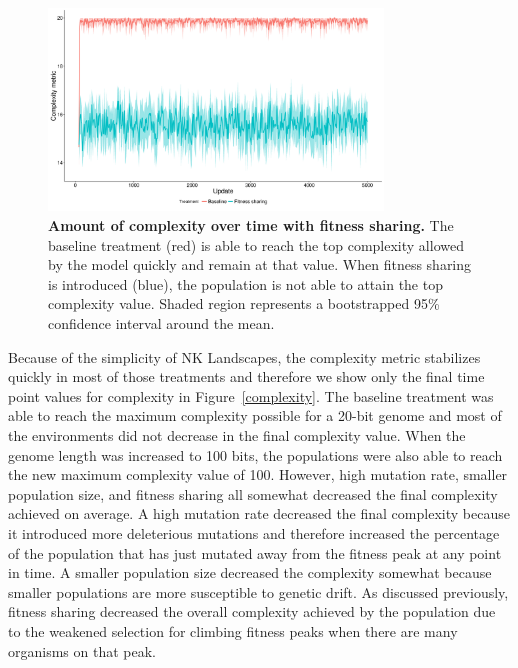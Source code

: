 \documentclass[letterpaper]{article}
\begin{document}
\begin{figure}
\includegraphics[width=3.5in]{figs/complexity_fitness_sharing.png}
\caption{\textbf{Amount of complexity over time with fitness sharing.} The baseline treatment (red) is able to reach the top complexity allowed by the model quickly and remain at that value. When fitness sharing is introduced (blue), the population is not able to attain the top complexity value. Shaded region represents a bootstrapped 95\% confidence interval around the mean.}
\label{complexity_time}
\end{figure}

Because of the simplicity of NK Landscapes, the complexity metric stabilizes quickly in most of those treatments and therefore we show only the final time point values for complexity in Figure~\ref{complexity}. The baseline treatment was able to reach the maximum complexity possible for a 20-bit genome and most of the environments did not decrease in the final complexity value. When the genome length was increased to 100 bits, the populations were also able to reach the new maximum complexity value of 100. However, high mutation rate, smaller population size, and fitness sharing all somewhat decreased the final complexity achieved on average. A high mutation rate decreased the final complexity because it introduced more deleterious mutations and therefore increased the percentage of the population that has just mutated away from the fitness peak at any point in time. A smaller population size decreased the complexity somewhat because smaller populations are more susceptible to genetic drift. As discussed previously, fitness sharing decreased the overall complexity achieved by the population due to the weakened selection for climbing fitness peaks when there are many organisms on that peak.
\end{document}
